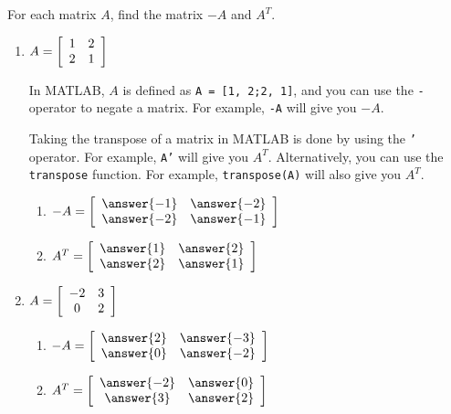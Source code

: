 \documentclass{ximera}
\author{Zack Reed}
\begin{document}
\begin{problem}
  For each matrix $A$, find the matrix $-A$ and $A^T$.
  \begin{enumerate}
    \item
    $A = \startmat{cc}
      1 & 2 \\
      2 & 1
    \stopmat$

    \begin{hint}
    
      In MATLAB, $A$ is defined as \texttt{A = [1, 2;2, 1]}, and you can use the \texttt{-} operator to negate a matrix. For example, \texttt{-A} will give you $-A$.

      Taking the transpose of a matrix in MATLAB is done by using the \texttt{'} operator. For example, \texttt{A'} will give you $A^T$. Alternatively, you can use the \texttt{transpose} function. For example, \texttt{transpose(A)} will also give you $A^T$.



    \end{hint}


    \begin{enumerate}
      \item $-A = 
      \startmat{cc}
      \answer{-1} & \answer{-2} \\
      \answer{-2} & \answer{-1}
      \stopmat$

      \item $A^T =
      \startmat{cc}
      \answer{1} & \answer{2} \\
      \answer{2} & \answer{1}
      \stopmat$
    \end{enumerate}
  
\item
    $A = \startmat{cc}
      -2 & 3 \\
      0 & 2
    \stopmat$

    \begin{enumerate}
      \item $-A = 
      \startmat{cc}
      \answer{2} & \answer{-3} \\
      \answer{0} & \answer{-2}
      \stopmat$

      \item $A^T =
      \startmat{cc}
      \answer{-2} & \answer{0} \\
      \answer{3} & \answer{2}
      \stopmat$
    \end{enumerate}


\end{enumerate}
\end{problem}
\end{document}
